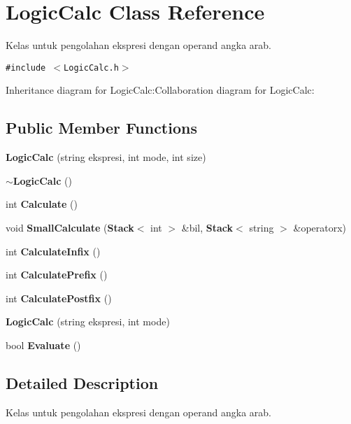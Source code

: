 \section{Logic\-Calc Class Reference}
\label{class_logic_calc}
Kelas untuk pengolahan ekspresi dengan operand angka arab.  


{\tt \#include $<$Logic\-Calc.h$>$}

Inheritance diagram for Logic\-Calc:Collaboration diagram for Logic\-Calc:\subsection*{Public Member Functions}
\begin{CompactItemize}
\item 
{\bf Logic\-Calc} (string ekspresi, int mode, int size)\label{class_logic_calc_2895e361ec59fad2e44b41c6e13ecdd1}

\item 
{\bf $\sim$Logic\-Calc} ()\label{class_logic_calc_129c0218dfc0e1ab7bcfae3fad00bd85}

\item 
int {\bf Calculate} ()\label{class_logic_calc_ef3b608a0cfab3929e1afe02afe9e580}

\item 
void {\bf Small\-Calculate} ({\bf Stack}$<$ int $>$ \&bil, {\bf Stack}$<$ string $>$ \&operatorx)\label{class_logic_calc_0f8f717719f6e76b6680f44bd81bbd9f}

\item 
int {\bf Calculate\-Infix} ()\label{class_logic_calc_39a440cd99043f8ef3809d8191620779}

\item 
int {\bf Calculate\-Prefix} ()\label{class_logic_calc_968d7f0f8876ad0fb9a25576e0f0e7c6}

\item 
int {\bf Calculate\-Postfix} ()\label{class_logic_calc_81d5c7f43d3de276cafd11096ec6204c}

\item 
{\bf Logic\-Calc} (string ekspresi, int mode)\label{class_logic_calc_7ce98b3d0da2d609cf18b455dcddef74}

\item 
bool {\bf Evaluate} ()\label{class_logic_calc_4d3a3ea0e4577095fc6bd5cbd2ef6e28}

\end{CompactItemize}


\subsection{Detailed Description}
Kelas untuk pengolahan ekspresi dengan operand angka arab. 



